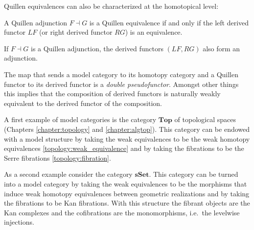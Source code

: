     Quillen equivalences can also be characterized at the homotopical level:
    \begin{property}
        A Quillen adjunction $F\dashv G$ is a Quillen equivalence if and only if the left derived functor $LF$ (or right derived functor $RG$) is an equivalence.
    \end{property}
    \begin{property}
        If $F\dashv G$ is a Quillen adjunction, the derived functors $(LF,RG)$ also form an adjunction.
    \end{property}

    \begin{property}
        The map that sends a model category to its homotopy category and a Quillen functor to its derived functor is a \textit{double pseudofunctor}. Amongst other things this implies that the composition of derived functors is naturally weakly equivalent to the derived functor of the composition.
    \end{property}

    \begin{example}
        A first example of model categories is the category $\mathbf{Top}$ of topological spaces (Chapters \ref{chapter:topology} and \ref{chapter:algtop}). This category can be endowed with a model structure by taking the weak equivalences to be the weak homotopy equivalences \ref{topology:weak_equivalence} and by taking the fibrations to be the Serre fibrations \ref{topology:fibration}.
    \end{example}
    \begin{example}\label{model:sset_model_structure}
        As a second example consider the category $\mathbf{sSet}$. This category can be turned into a model category by taking the weak equivalences to be the morphisms that induce weak homotopy equivalences between geometric realizations and by taking the fibrations to be Kan fibrations. With this structure the fibrant objects are the Kan complexes and the cofibrations are the monomorphisms, i.e.~the levelwise injections.
    \end{example}

